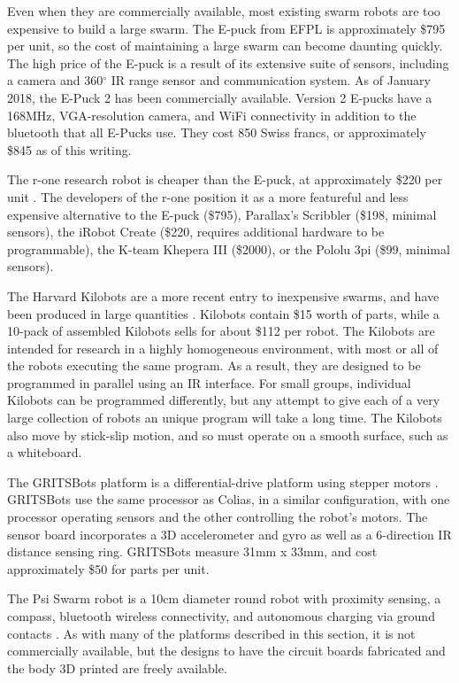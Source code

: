 Even when they are commercially available, most existing swarm robots are too expensive to build a large swarm.
The E-puck from EFPL is approximately \$795 per unit, so the cost of maintaining a large swarm can become daunting quickly. 
The high price of the E-puck is a result of its extensive suite of sensors, including a camera and 360$^{\circ}$ IR range sensor and communication system. 
As of January 2018, the E-Puck 2 has been commercially available. 
Version 2 E-pucks have a 168MHz, VGA-resolution camera, and WiFi connectivity in addition to the bluetooth that all E-Pucks use. 
They cost 850 Swiss francs, or approximately \$845 as of this writing. 

The r-one research robot is cheaper than the E-puck, at approximately \$220 per unit \citep{mclurkin2013low}. 
The developers of the r-one position it as a more featureful and less expensive alternative to the E-puck (\$795), Parallax's Scribbler (\$198, minimal sensors), the iRobot Create (\$220, requires additional hardware to be programmable), the K-team Khepera III (\$2000), or the Pololu 3pi (\$99, minimal sensors). 

The Harvard Kilobots are a more recent entry to inexpensive swarms, and have been produced in large quantities \citep{rubenstein2014kilobot}. 
Kilobots contain \$15 worth of parts, while a 10-pack of assembled Kilobots sells for about \$112 per robot. 
The Kilobots are intended for research in a highly homogeneous environment, with most or all of the robots executing the same program. 
As a result, they are designed to be programmed in parallel using an IR interface. 
For small groups, individual Kilobots can be programmed differently, but any attempt to give each of a very large collection of robots an unique program will take a long time. 
The Kilobots also move by stick-slip motion, and so must operate on a smooth surface, such as a whiteboard. 

The GRITSBots platform is a differential-drive platform using stepper motors \citep{pickem2015gritsbot}.
GRITSBots use the same processor as Colias, in a similar configuration, with one processor operating sensors and the other controlling the robot's motors. 
The sensor board incorporates a 3D accelerometer and gyro as well as a 6-direction IR distance sensing ring. 
GRITSBots measure 31mm x 33mm, and cost approximately \$50 for parts per unit. 

The Psi Swarm robot is a 10cm diameter round robot with proximity sensing, a compass, bluetooth wireless connectivity, and autonomous charging via ground contacts \citep{hilder2016psi}.
As with many of the platforms described in this section, it is not commercially available, but the designs to have the circuit boards fabricated and the body 3D printed are freely available. 

